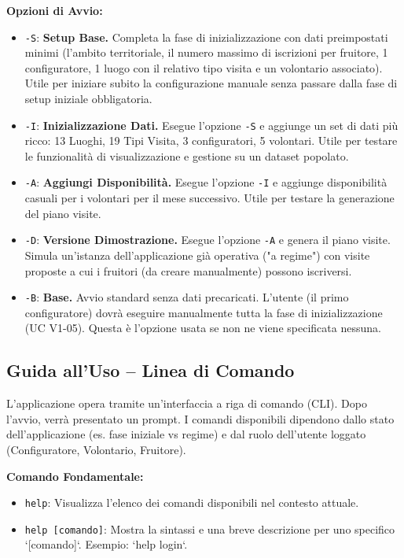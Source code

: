 \documentclass[a4paper,12pt]{article}
\begin{document}
    \textbf{Opzioni di Avvio:}
    \begin{itemize}
        \item \texttt{-S}: \textbf{Setup Base.} Completa la fase di inizializzazione con dati preimpostati minimi (l'ambito territoriale, il numero massimo di iscrizioni per fruitore, 1 configuratore, 1 luogo con il relativo tipo visita e un volontario associato). Utile per iniziare subito la configurazione manuale senza passare dalla fase di setup iniziale obbligatoria.
        \item \texttt{-I}: \textbf{Inizializzazione Dati.} Esegue l'opzione \texttt{-S} e aggiunge un set di dati più ricco: 13 Luoghi, 19 Tipi Visita, 3 configuratori, 5 volontari. Utile per testare le funzionalità di visualizzazione e gestione su un dataset popolato.
        \item \texttt{-A}: \textbf{Aggiungi Disponibilità.} Esegue l'opzione \texttt{-I} e aggiunge disponibilità casuali per i volontari per il mese successivo. Utile per testare la generazione del piano visite.
        \item \texttt{-D}: \textbf{Versione Dimostrazione.} Esegue l'opzione \texttt{-A} e genera il piano visite. Simula un'istanza dell'applicazione già operativa ("a regime") con visite proposte a cui i fruitori (da creare manualmente) possono iscriversi.
        \item \texttt{-B}: \textbf{Base.} Avvio standard senza dati precaricati. L'utente (il primo configuratore) dovrà eseguire manualmente tutta la fase di inizializzazione (UC V1-05). Questa è l'opzione usata se non ne viene specificata nessuna.
    \end{itemize}

    \subsection{Guida all'Uso -- Linea di Comando}
    L'applicazione opera tramite un'interfaccia a riga di comando (CLI). Dopo l'avvio, verrà presentato un prompt. I comandi disponibili dipendono dallo stato dell'applicazione (es. fase iniziale vs regime) e dal ruolo dell'utente loggato (Configuratore, Volontario, Fruitore).

    \textbf{Comando Fondamentale:}
    \begin{itemize}
        \item \texttt{help}: Visualizza l'elenco dei comandi disponibili nel contesto attuale.
        \item \texttt{help [comando]}: Mostra la sintassi e una breve descrizione per uno specifico `[comando]`. Esempio: `help login`.
    \end{itemize}
\end{document}
